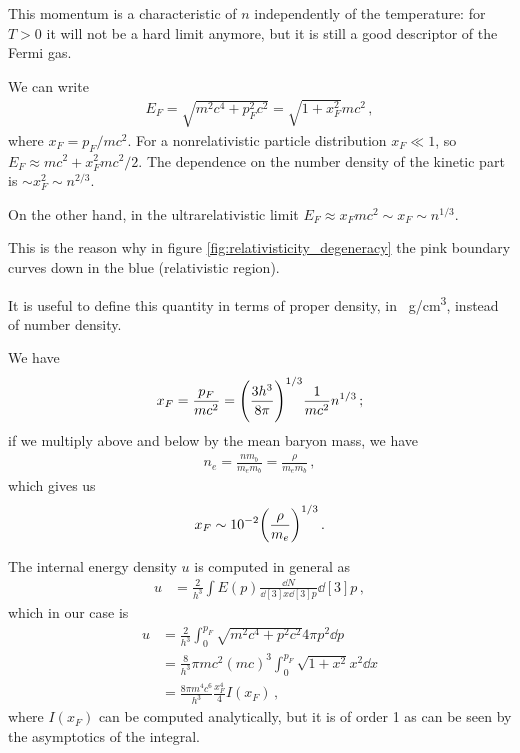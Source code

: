 \documentclass[main.tex]{subfiles}
\begin{document}
This momentum is a characteristic of \(n\) independently of the temperature: for \(T > 0\) it will not be a hard limit anymore, but it is still a good descriptor of the Fermi gas. 

We can write 
%
\begin{align}
E_F = \sqrt{m^2 c^{4} + p_F^2 c^2} = \sqrt{1 + x_F^2} m c^2
\,,
\end{align}
%
where \(x_F = p_F / mc^2\).
For a nonrelativistic particle distribution \(x_F \ll 1\), so \(E_F \approx mc^2 + x_F^2 mc^2/2\). 
The dependence on the number density of the kinetic part is \(\sim x_F^{2} \sim n^{2/3}\). 

On the other hand, in the ultrarelativistic limit \(E_F \approx x_F mc^2 \sim x_F \sim n^{1/3}\).

This is the reason why in figure \ref{fig:relativisticity_degeneracy} the pink boundary curves down in the blue (relativistic region). 

It is useful to define this quantity in terms of proper density, in \SI{}{g/cm^3}, instead of number density.

We have 
%
\begin{align}
x_F = \frac{p_F}{mc^2} = \qty( \frac{3h^3}{8 \pi })^{1/3} \frac{1}{mc^2} n^{1/3}
\,;
\end{align}
%
if we multiply above and below by the mean baryon mass, we have 
%
\begin{align}
n_e = \frac{n m_b}{m_e m_b} = \frac{\rho}{m_e m_b} 
\,,
\end{align}
%
which gives us 
%
\begin{align}
x_F \sim \num{e-2} \qty(\frac{\rho }{m_e})^{1/3}
\,.
\end{align}


The internal energy density \(u\) is computed in general as 
%
\begin{align}
u &= \frac{2}{h^3}\int E(p) \frac{ \dd{N}}{ \dd[3]{x} \dd[3]{p}} \dd[3]{p} 
\,,
\end{align}
%
which in our case is 
%
\begin{align}
u &= \frac{2}{h^3} \int_{0}^{p_F} \sqrt{m^2c^{4} + p^2c^2} 4 \pi p^2 \dd{p}  \\
&= \frac{8}{h^3} \pi  mc^2 (mc)^3 \int_0^{p_F} \sqrt{1 + x^2} x^2 \dd{x}  \\
&= \frac{8 \pi m^4 c^{6}}{h^3} \frac{x_F^{4}}{4} I(x_F)
\,,
\end{align}
%
where \(I(x_F)\) can be computed analytically, but it is of order 1 as can be seen by the asymptotics of the integral. 
\end{document}
